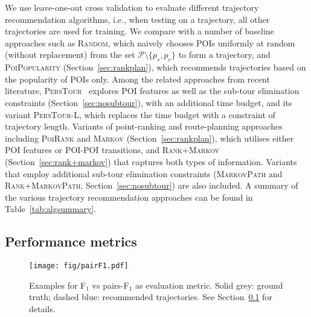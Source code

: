 We use leave-one-out cross validation to evaluate different trajectory recommendation algorithms,
i.e., when testing on a trajectory, all other trajectories are used for training.
We compare with a number of baseline approaches such as \textsc{Random},
which naively chooses POIs uniformly at random (without replacement) from the set $\mathcal{P} \setminus \{p_s, p_e \}$ to form a trajectory,
and \textsc{PoiPopularity} (Section~\ref{sec:rankplan}), which recommends trajectories based on the popularity of POIs only.
Among the related approaches from recent literature,
\textsc{PersTour}~\cite{ijcai15} explores POI features as well as the sub-tour elimination constraints (Section~\ref{sec:nosubtour}),
with an additional time budget, and its variant \textsc{PersTour-L},
which replaces the time budget with a constraint of trajectory length.
Variants of point-ranking and route-planning approaches including \textsc{PoiRank} and \textsc{Markov} (Section~\ref{sec:rankplan}),
which utilises either POI features or POI-POI transitions,
and \textsc{Rank+Markov} (Section~\ref{sec:rank+markov}) that captures both types of information. %
Variants that employ additional sub-tour elimination constraints
(\textsc{MarkovPath} and \textsc{Rank+MarkovPath}, Section~\ref{sec:nosubtour}) are also included.
A summary of the various trajectory recommendation approaches can be found in Table~\ref{tab:algsummary}.





\secmoveup
\subsection{Performance metrics}
\label{sec:metric}


\begin{figure}[t]
	\centering
	\texttt{[image: fig/pairF1.pdf]}
	\caption{Examples for F$_1$ vs pairs-F$_1$ as evaluation metric.
Solid grey: ground truth; dashed blue: recommended trajectories. See Section~\ref{sec:metric} for details.}
	\label{fig:pairf1}\captionmoveup
\end{figure}

